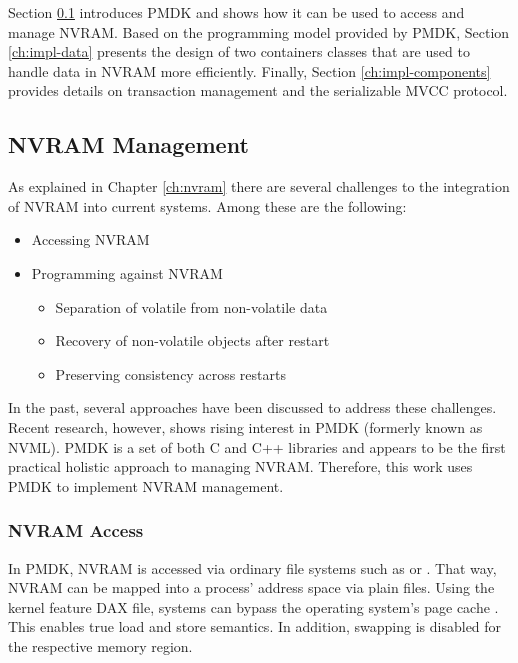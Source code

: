 Section \ref{ch:impl-nvram} introduces PMDK and shows how it can be used to
access and manage NVRAM. Based on the programming model provided by PMDK, Section
\ref{ch:impl-data} presents the design of two containers classes that are used
to handle data in NVRAM more efficiently. Finally, Section \ref{ch:impl-components}
provides details on transaction management and the serializable MVCC protocol.

\subsection{NVRAM Management}
\label{ch:impl-nvram}

As explained in Chapter \ref{ch:nvram} there are several challenges to the
integration of NVRAM into current systems. Among these are the following:

\begin{itemize}
    \item Accessing NVRAM
    \item Programming against NVRAM
    \begin{itemize}
        \item Separation of volatile from non-volatile data
        \item Recovery of non-volatile objects after restart
        \item Preserving consistency across restarts
    \end{itemize}
\end{itemize}

In the past, several approaches have been discussed to address these challenges.
Recent research, however, shows rising interest in PMDK (formerly known as
NVML). PMDK is a set of both C and C++ libraries and appears to be the first
practical holistic approach to managing NVRAM. Therefore, this work uses PMDK to
implement NVRAM management.

\subsubsection{NVRAM Access}

In PMDK, NVRAM is accessed via ordinary file systems such as  or
. That way, NVRAM can be mapped into a process' address space via
plain files. Using the kernel feature \ac{DAX} file,
systems can bypass the operating system's page cache \cite{oukid2017data,
andrei2017sap, rudoff2017persistent}. This enables true load and store
semantics. In addition, swapping is disabled for the respective memory region.

